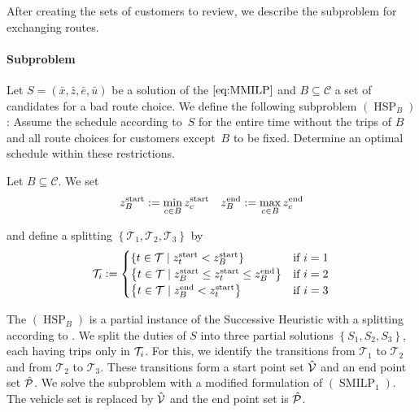 After creating the sets of customers to review, we describe the subproblem for exchanging routes.

\paragraph{Subproblem} \parfill

Let $S=\left(\bar{x},\bar{z},\bar{e},\bar{u}\right)$ be a solution of the $\eqref{eq:MMILP}$ and $B\subseteq\mathcal{C}$ a set of candidates for a bad route choice. We define the following subproblem $(\operatorname{HSP}_B)$: Assume the schedule according to~$S$ for the entire time without the trips of $B$ and all route choices for customers except~$B$ to be fixed. Determine an optimal schedule within these restrictions.

\begin{definition}
\label{def:splitting_HSP}

Let ${B\subseteq\mathcal{C}}$. We set
\begin{align*}
	z^{\operatorname{start}}_B := \min_{c\in B}z^{\operatorname{start}}_c && z^{\operatorname{end}}_B := \max_{c\in B}z^{\operatorname{end}}_c
\end{align*}

and define a splitting $\left\{\mathcal{T}_1,\mathcal{T}_2,\mathcal{T}_3\right\}$ by
\begin{align*}
	\mathcal{T}_i := \begin{cases}
		\left\{t\in\mathcal{T}\mid z^{\operatorname{start}}_t<z^{\operatorname{start}}_B\right\} & \text{if } i=1 \\
		\left\{t\in\mathcal{T}\mid z^{\operatorname{start}}_B\leq z^{\operatorname{start}}_t\leq z^{\operatorname{end}}_B\right\} & \text{if } i=2 \\
		\left\{t\in\mathcal{T}\mid z^{\operatorname{end}}_B<z^{\operatorname{start}}_t\right\} & \text{if } i=3
	\end{cases}
\end{align*}

\end{definition}

The $(\operatorname{HSP}_B)$ is a partial instance of the Successive Heuristic with a splitting according to . We split the duties of $S$ into three partial solutions $\left\{S_1,S_2,S_3\right\}$, each having trips only in $\mathcal{T}_i$. For this, we identify the transitions from $\mathcal{T}_1$ to $\mathcal{T}_2$ and from $\mathcal{T}_2$ to $\mathcal{T}_3$. These transitions form a start point set $\hat{\mathcal{V}}$ and an end point set $\hat{\mathcal{P}}$. We solve the subproblem with a modified formulation of $(\operatorname{SMILP}_1)$. The vehicle set is replaced by $\hat{\mathcal{V}}$ and the end point set is $\hat{\mathcal{P}}$. 

